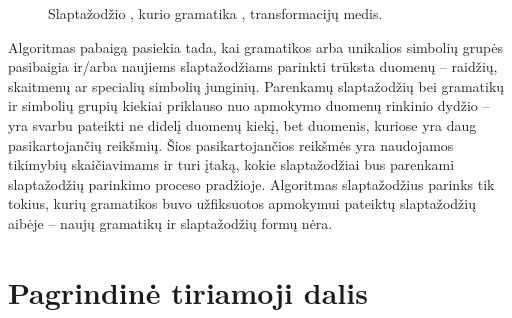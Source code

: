 \documentclass{VUMIFInfBakalaurinis}
\begin{document}
\begin{figure}
  \caption{
    Slaptažodžio , kurio gramatika ,
    transformacijų medis.
  }
  \label{plot:pcfgtransforms}
\end{figure}

Algoritmas pabaigą pasiekia tada, kai gramatikos arba unikalios simbolių grupės 
pasibaigia ir/arba naujiems slaptažodžiams parinkti trūksta duomenų -- raidžių, 
skaitmenų ar specialių simbolių junginių. Parenkamų slaptažodžių bei gramatikų 
ir simbolių grupių kiekiai priklauso nuo apmokymo duomenų rinkinio dydžio -- yra 
svarbu pateikti ne didelį duomenų kiekį, bet duomenis, kuriose yra daug 
pasikartojančių reikšmių. Šios pasikartojančios reikšmės yra naudojamos 
tikimybių skaičiavimams ir turi įtaką, kokie slaptažodžiai bus parenkami 
slaptažodžių parinkimo proceso pradžioje.
Algoritmas slaptažodžius parinks tik tokius, kurių gramatikos buvo užfiksuotos 
apmokymui pateiktų slaptažodžių aibėje -- naujų gramatikų ir slaptažodžių formų 
nėra.

\section{Pagrindinė tiriamoji dalis}
\end{document}
